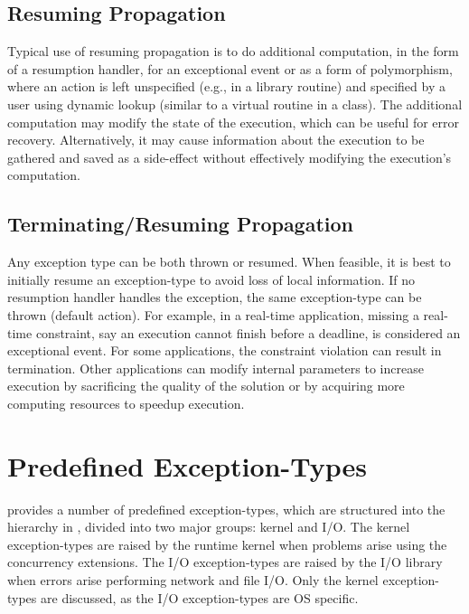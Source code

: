 \documentclass[openright,twoside]{report}
\begin{document}
\subsection{Resuming Propagation}

Typical use of resuming propagation is to do additional computation, in the form of a resumption handler, for an exceptional event or as a form of polymorphism, where an action is left unspecified (e.g., in a library routine) and specified by a user using dynamic lookup (similar to a virtual routine in a class).
The additional computation may modify the state of the execution, which can be useful for error recovery.
Alternatively, it may cause information about the execution to be gathered and saved as a side-effect without effectively modifying the execution's computation.


\subsection{Terminating/Resuming Propagation}

Any exception type can be both thrown or resumed.
When feasible, it is best to initially resume an exception-type to avoid loss of local information.
If no resumption handler handles the exception, the same exception-type can be thrown (default action).
For example, in a real-time application, missing a real-time constraint, say an execution cannot finish before a deadline, is considered an exceptional event.
For some applications, the constraint violation can result in termination.
Other applications can modify internal parameters to increase execution by sacrificing the quality of the solution or by acquiring more computing resources to speedup execution.


\section{Predefined Exception-Types}
\label{s:PredefinedExceptionTypes}

\uC provides a number of predefined exception-types, which are structured into the hierarchy in , divided into two major groups: kernel and I/O.
The kernel exception-types are raised by the \uC runtime kernel when problems arise using the \uC concurrency extensions.
The I/O exception-types are raised by the \uC I/O library when errors arise performing network and file I/O.
Only the kernel exception-types are discussed, as the I/O exception-types are OS specific.
\end{document}
